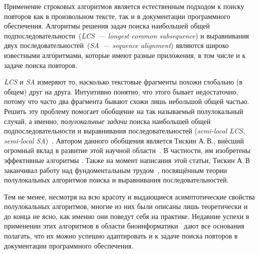 
Применение строковых алгоритмов является %
естественным подходом к поиску повторов как в произвольном тексте, так и в документации программного обеспечения.
Алгоритмы решения задач поиска наибольшей общей подпоследовательности~(\emph{LCS~--- longest common subsequence}) и выравнивания двух последовательностей~(\emph{SA~--- sequence alignment}) являются широко известными алгоритмами, которые имеют разные приложения, в том числе и к задаче поиска повторов.

\emph{LCS} и \emph{SA} измеряют то, насколько текстовые фрагменты похожи глобально (в общем) друг на друга. 
Интуитивно понятно, что этого бывает недостаточно, потому что часто два фрагмента бывают схожи лишь небольшой общей частью.
Решить эту проблему помогает обобщение на так называемый полулокальный случай, а именно, \emph{полулокальные задачи} поиска наибольшей общей подпоследовательности и выравнивания последовательностей (\emph{semi-local LCS, semi-local SA})~\cite{tiskin2006all}.
Автором данного обобщения является Тискин А.\,В., внёсший огромный вклад в развитие этой научной области~\cite{tiskin2015fast,tiskin2019bounded,krusche2009parallel,tiskin2006longest,tiskin2008semi,tiskin2011towards}.
В частности, им изобретены эффективные алгоритмы .
Также на момент написания этой статьи, Тискин А.\,В заканчивал работу над фундоментальным трудом~\cite{tiskin2006all}, посвящённым теории полулокальных алгоритмов поиска и выравнивания последовательностей.


Тем не менее, несмотря на всю красоту и выдающиеся асимптотические свойства полулокальных алгоритмов, многие из них были описаны лишь теоретически и до конца не ясно, как именно они поведут себя на практике.
Недавние успехи в применении этих алгоритмов в области биоинформатики~\cite{baxter2012conserved,davies2015analysis, picot2010evolutionary} дают все основания полагать, что их можно успешно адаптировать и к задаче поиска повторов в документации программного обеспечения.

